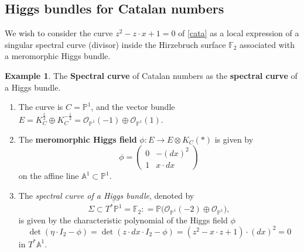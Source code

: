 \documentclass[oneside, 11pt]{amsart}
\theoremstyle{definition}
\newtheorem{ex}{Example}[section]
\numberwithin{equation}{subsection}
\def\dsum{\oplus}
\newcommand{\bA}{{\mathbb{A}}}
\newcommand{\bP}{{\mathbb{P}}}
\begin{document}
\subsection{Higgs bundles for Catalan numbers}\label{spectral curve}



We wish to consider the  curve $z^2-z\cdot x+1 = 0$ of \eqref{cata} as a local expression of a singular 
spectral curve (divisor) inside the Hirzebruch surface $\mathbb{F}_2$ associated with 
a meromorphic Higgs bundle.

\begin{ex}{The \textbf{Spectral curve} of Catalan
numbers  as the \textbf{spectral curve} of a Higgs bundle.}
\begin{enumerate}
\item The curve is $C=\mathbb{P}^1$, and the vector bundle $E=K_C^{\frac{1}{2}}\dsum K_C^{-\frac{1}{2}}=\mathcal{O}_{\bP^1}(-1)\oplus \mathcal{O}_{\bP^1}(1).$
\item The \textbf{meromorphic Higgs field} $\phi:E\stackrel{}{\rightarrow}E\otimes K_C(\ast)$ is given by
$$\phi=\begin{pmatrix}
0&-(dx)^2\\1& x\cdot dx
\end{pmatrix}$$
on the affine line $\bA^1\subset \bP^1$.
\item The \textit{spectral curve of a Higgs bundle}, denoted by 
$$\Sigma\subset \overline{T^*\mathbb{P}^1}=\mathbb{F}_2: = \bP\big(\mathcal{O}_{\bP^1}(-2)\oplus \mathcal{O}_{\bP^1}\big),
$$ is given by the characteristic polynomial of the Higgs field $\phi$ 
$$\det(\eta \cdot I_2-\phi)=\det(z\cdot dx\cdot I_2-\phi)=(z^2-x\cdot z+1)\cdot(dx)^2=0$$ in $T^*\bA^1$.
\end{enumerate}

\end{ex}
\end{document}
